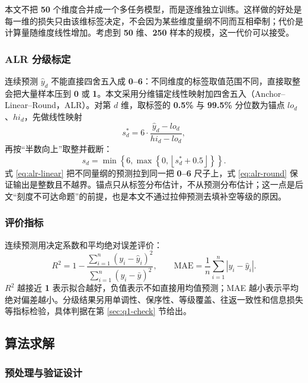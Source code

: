 本文不把 \textbf{50} 个维度合并成一个多任务模型，而是逐维独立训练。这样做的好处是每一维的损失只由该维标签决定，不会因为某些维度量纲不同而互相牵制；代价是计算量随维度线性增加。考虑到 \textbf{50} 维、\textbf{250} 样本的规模，这一代价可以接受。

\subsubsection{ALR 分级标定}

连续预测 $\hat y_d$ 不能直接四舍五入成 \textbf{0--6}：不同维度的标签取值范围不同，直接取整会把大量样本压到 \textbf{0} 或 \textbf{1}。本文采用分维锚定线性映射加四舍五入（Anchor--Linear--Round，ALR）。对第 $d$ 维，取标签的 \textbf{0.5\%} 与 \textbf{99.5\%} 分位数为锚点 $lo_d$、$hi_d$，先做线性映射
\begin{equation}
s_d^{\ast}=6\cdot\frac{\hat y_d-lo_d}{hi_d-lo_d},
\label{eq:alr-linear}
\end{equation}
再按“半数向上”取整并截断：
\begin{equation}
s_d=\min\left\{6,\max\left\{0,\left\lfloor s_d^{\ast}+0.5\right\rfloor\right\}\right\}.
\label{eq:alr-round}
\end{equation}
式 \eqref{eq:alr-linear} 把不同量纲的预测拉到同一把 \textbf{0--6} 尺子上，式 \eqref{eq:alr-round} 保证输出是整数且不越界。锚点只从标签分布估计，不从预测分布估计；这一点是后文“刻度不可达命题”的前提，也是本文不通过拉伸预测去填补空等级的原因。

\subsubsection{评价指标}

连续预测用决定系数和平均绝对误差评价：
\begin{equation}
R^2=1-\frac{\sum_{i=1}^{n}(y_i-\hat y_i)^2}{\sum_{i=1}^{n}(y_i-\bar y)^2},\qquad
\mathrm{MAE}=\frac{1}{n}\sum_{i=1}^{n}\left|y_i-\hat y_i\right|.
\label{eq:metrics}
\end{equation}
$R^2$ 越接近 \textbf{1} 表示拟合越好，负值表示不如直接用均值预测；MAE 越小表示平均绝对偏差越小。分级结果另用单调性、保序性、等级覆盖、往返一致性和信息损失等指标检验，具体判据在第 \ref{sec:q1-check} 节给出。

\subsection{算法求解}

\subsubsection{预处理与验证设计}

